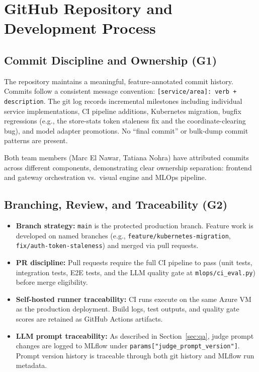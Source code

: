 \documentclass[12pt]{article}
\begin{document}
\section{GitHub Repository and Development Process}
\label{sec:github}

\subsection{Commit Discipline and Ownership (G1)}

The repository maintains a meaningful, feature-annotated commit history. Commits follow a consistent message convention: \texttt{[service/area]: verb + description}. The git log records incremental milestones including individual service implementations, CI pipeline additions, Kubernetes migration, bugfix regressions (e.g., the store-stats token staleness fix and the coordinate-clearing bug), and model adapter promotions. No ``final commit'' or bulk-dump commit patterns are present.

Both team members (Marc El Nawar, Tatiana Nohra) have attributed commits across different components, demonstrating clear ownership separation: frontend and gateway orchestration vs.\ visual engine and MLOps pipeline.

\subsection{Branching, Review, and Traceability (G2)}

\begin{itemize}[leftmargin=*]
  \item \textbf{Branch strategy:} \texttt{main} is the protected production branch. Feature work is developed on named branches (e.g., \texttt{feature/kubernetes-migration}, \texttt{fix/auth-token-staleness}) and merged via pull requests.
  \item \textbf{PR discipline:} Pull requests require the full CI pipeline to pass (unit tests, integration tests, E2E tests, and the LLM quality gate at \texttt{mlops/ci\_eval.py}) before merge eligibility.
  \item \textbf{Self-hosted runner traceability:} CI runs execute on the same Azure VM as the production deployment. Build logs, test outputs, and quality gate scores are retained as GitHub Actions artifacts.
  \item \textbf{LLM prompt traceability:} As described in Section~\ref{sec:qa}, judge prompt changes are logged to MLflow under \texttt{params["judge\_prompt\_version"]}. Prompt version history is traceable through both git history and MLflow run metadata.
\end{itemize}
\end{document}

